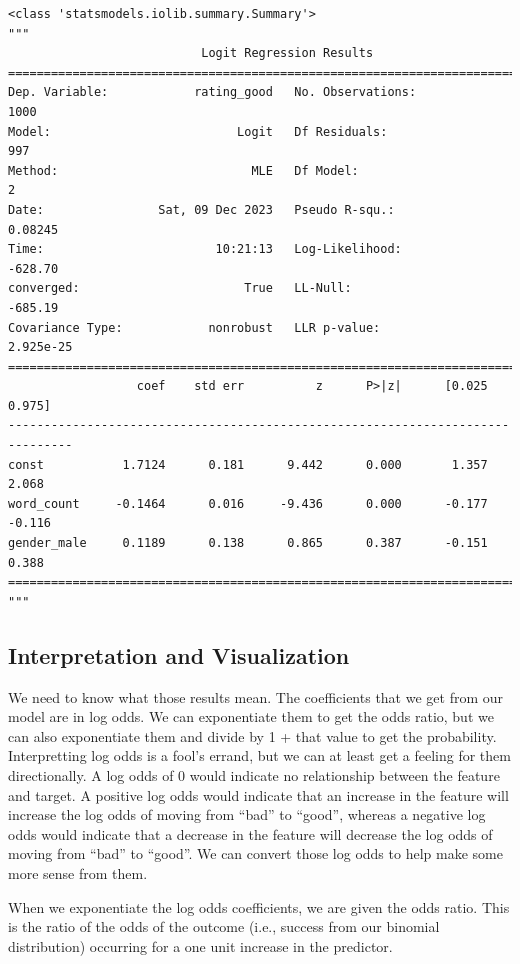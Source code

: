 \documentclass[
  letterpaper,
]{krantz}
\begin{document}
\begin{verbatim}
<class 'statsmodels.iolib.summary.Summary'>
"""
                           Logit Regression Results                           
==============================================================================
Dep. Variable:            rating_good   No. Observations:                 1000
Model:                          Logit   Df Residuals:                      997
Method:                           MLE   Df Model:                            2
Date:                Sat, 09 Dec 2023   Pseudo R-squ.:                 0.08245
Time:                        10:21:13   Log-Likelihood:                -628.70
converged:                       True   LL-Null:                       -685.19
Covariance Type:            nonrobust   LLR p-value:                 2.925e-25
===============================================================================
                  coef    std err          z      P>|z|      [0.025      0.975]
-------------------------------------------------------------------------------
const           1.7124      0.181      9.442      0.000       1.357       2.068
word_count     -0.1464      0.016     -9.436      0.000      -0.177      -0.116
gender_male     0.1189      0.138      0.865      0.387      -0.151       0.388
===============================================================================
"""
\end{verbatim}

\subsection{Interpretation and
Visualization}\label{interpretation-and-visualization}

We need to know what those results mean. The coefficients that we get
from our model are in log odds. We can exponentiate them to get the odds
ratio, but we can also exponentiate them and divide by 1 + that value to
get the probability. Interpretting log odds is a fool's errand, but we
can at least get a feeling for them directionally. A log odds of 0 would
indicate no relationship between the feature and target. A positive log
odds would indicate that an increase in the feature will increase the
log odds of moving from ``bad'' to ``good'', whereas a negative log odds
would indicate that a decrease in the feature will decrease the log odds
of moving from ``bad'' to ``good''. We can convert those log odds to
help make some more sense from them.

When we exponentiate the log odds coefficients, we are given the odds
ratio. This is the ratio of the odds of the outcome (i.e., success from
our binomial distribution) occurring for a one unit increase in the
predictor.
\end{document}
